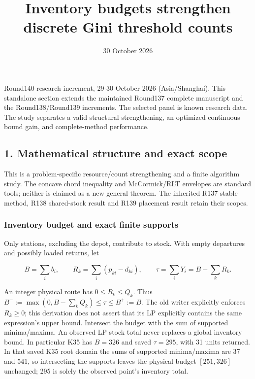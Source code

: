 \documentclass[
  american,
  11pt,
]{article}
\title{Inventory budgets strengthen discrete Gini threshold counts}
\author{}
\date{30 October 2026}
\begin{document}
\maketitle

{
\setcounter{tocdepth}{2}
\tableofcontents
}
Round140 research increment, 29-30 October 2026 (Asia/Shanghai). This
standalone section extends the maintained Round137 complete manuscript
and the Round138/Round139 increments. The selected panel is known
research data. The study separates a valid structural strengthening, an
optimized continuous bound gain, and complete-method performance.

\subsection{1. Mathematical structure and exact
scope}\label{mathematical-structure-and-exact-scope}

This is a problem-specific resource/count strengthening and a finite
algorithm study. The concave chord inequality and McCormick/RLT
envelopes are standard tools; neither is claimed as a new general
theorem. The inherited R137 stable method, R138 shared-stock result and
R139 placement result retain their scopes.

\subsubsection{Inventory budget and exact finite
supports}\label{inventory-budget-and-exact-finite-supports}

Only stations, excluding the depot, contribute to stock. With empty
departures and possibly loaded returns, let

\[
B=\sum_i b_i,\qquad R_k=\sum_i(p_{ki}-d_{ki}),\qquad
\tau=\sum_iY_i=B-\sum_kR_k.
\]

An integer physical route has \(0\le R_k\le Q_k\). Thus
\(B^-:=\max(0,B-\sum_kQ_k)\le\tau\le B^+:=B\). The old writer explicitly
enforces \(R_k\ge0\); this derivation does not assert that its LP
explicitly contains the same expression's upper bound. Intersect the
budget with the sum of supported minima/maxima. An observed LP stock
total never replaces a global inventory bound. In particular K35 has
\(B=326\) and saved \(\tau=295\), with 31 units returned. In that saved
K35 root domain the sums of supported minima/maxima are 37 and 541, so
intersecting the supports leaves the physical budget \([251,326]\)
unchanged; 295 is solely the observed point's inventory total.
\end{document}
